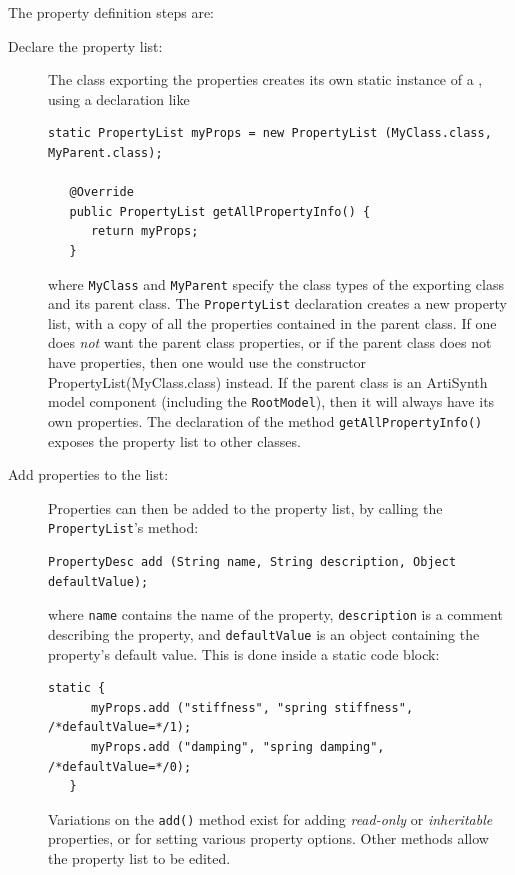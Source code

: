 The property definition steps are:

\begin{description}

\item[Declare the property list:]\mbox{}

The class exporting the properties creates its own static instance of
a , using a declaration
like
%
\begin{lstlisting}[]
   static PropertyList myProps = new PropertyList (MyClass.class, MyParent.class);

   @Override   
   public PropertyList getAllPropertyInfo() {
      return myProps;
   }  
\end{lstlisting}
%
where {\tt MyClass} and {\tt MyParent} specify the class types of the
exporting class and its parent class. The {\tt PropertyList}
declaration creates a new property list, with a copy of all the
properties contained in the parent class.  If one does {\it not} want
the parent class properties, or if the parent class does not have
properties, then one would use the constructor
%
{PropertyList(MyClass.class)} instead. If the parent class is an
ArtiSynth model component (including the {\tt RootModel}), then it
will always have its own properties. The declaration of the method
{\tt getAllPropertyInfo()} exposes the property list to other classes.

\item[Add properties to the list:]\mbox{}

Properties can then be added to the property list, by calling the {\tt
PropertyList}'s
method:
%
\begin{lstlisting}[]
   PropertyDesc add (String name, String description, Object defaultValue);
\end{lstlisting}
%
where {\tt name} contains the name of the property, {\tt description}
is a comment describing the property, and {\tt defaultValue} is an
object containing the property's default value.  This is done inside a
static code block:
%
\begin{lstlisting}[]
   static {
      myProps.add ("stiffness", "spring stiffness", /*defaultValue=*/1);
      myProps.add ("damping", "spring damping", /*defaultValue=*/0);
   }
\end{lstlisting}
%
Variations on the {\tt add()} method exist for adding {\it read-only}
or {\it inheritable} properties, or for setting various property
options. Other methods allow the property list to be edited.


\end{description}
